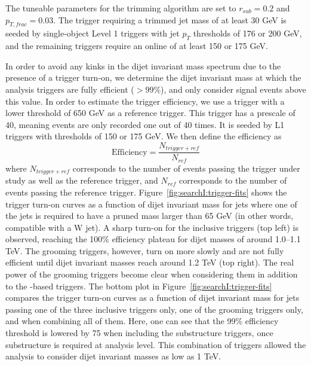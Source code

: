 The tuneable parameters for the trimming algorithm are set to $r_{sub}=0.2$ and $p_{T,frac}=0.03$. The trigger requiring a trimmed jet mass of at least 30 GeV is seeded by single-object Level 1 triggers with jet $p_T$ thresholds of 176 or 200 GeV, and the remaining triggers require an online \HT of at least 150 or 175 GeV.\par
In order to avoid any kinks in the dijet invariant mass spectrum due to the presence of a trigger turn-on, we determine the dijet invariant mass at which the analysis triggers are fully efficient ($>99\%$), and only consider signal events above this value. In order to estimate the trigger efficiency, we use a trigger with a lower \HT threshold of 650 GeV as a reference trigger. This trigger has a prescale of 40, meaning events are only recorded one out of 40 times. It is seeded by L1 \HT triggers with thresholds of 150 or 175 GeV. We then define the efficiency as
\begin{equation*}
\textrm{Efficiency} = \frac{N_{trigger+ref}}{N_{ref}}  
\end{equation*}
where $N_{trigger+ref}$ corresponds to the number of events passing the trigger under study as well as the reference trigger, and $N_{ref}$ corresponds to the number of events passing the reference trigger. Figure~\ref{fig:searchI:trigger-fits} shows the trigger turn-on curves as a function of dijet invariant mass for jets where one of the jets is required to have a pruned mass larger than 65 GeV (in other words, compatible with a W jet). A sharp turn-on for the inclusive triggers (top left) is observed, reaching the 100\% efficiency plateau for dijet masses of around 1.0--1.1 TeV. The grooming triggers, however, turn on more slowly and are not fully efficient until dijet invariant masses reach around 1.2 TeV (top right). The real power of the grooming triggers become clear when considering them in addition to the \HT-based triggers. The bottom plot in Figure~\ref{fig:searchI:trigger-fits} compares the trigger turn-on curves as a function of dijet invariant mass for jets passing one of the three inclusive triggers only, one of the grooming triggers only, and when combining all of them. Here, one can see that the 99\% efficiency threshold is lowered by 75 \GeV when including the substructure triggers, once substructure is required at analysis level. This combination of triggers allowed the analysis to consider dijet invariant masses as low as 1 TeV.
